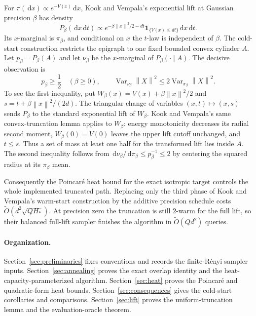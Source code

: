 \documentclass[11pt]{article}
\theoremstyle{remark}
\newcommand{\1}{\bm 1}
\newcommand{\Var}{\operatorname{Var}}
\newcommand{\dd}{\,\mathrm d}
\newcommand{\norm}[1]{\left\lVert #1\right\rVert}
\begin{document}
For $\pi(\dd x)\propto e^{-V(x)}\dd x$, Kook and Vempala's exponential
lift at Gaussian precision $\beta$ has density
\[
  P_\beta(\dd x\dd t)\propto
  e^{-\beta\norm x^2/2-dt}\1_{\{V(x)\leq dt\}}\dd x\dd t.
\]
Its $x$-marginal is $\pi_\beta$, and conditional on $x$ the $t$-law is
independent of $\beta$.  The cold-start construction restricts the
epigraph to one fixed bounded convex cylinder $A$.  Let
$p_\beta=P_\beta(A)$ and let $\nu_\beta$ be the $x$-marginal of
$P_\beta(\cdot\mid A)$.  The decisive observation is
\begin{equation}\label{eq:intro-uniform-truncation}
  p_\beta\geq\frac12\quad(\beta\geq0),
  \qquad
  \Var_{\nu_\beta}\norm X^2
  \leq2\Var_{\pi_\beta}\norm X^2.
\end{equation}
To see the first inequality, put
$W_\beta(x)=V(x)+\beta\norm x^2/2$ and
$s=t+\beta\norm x^2/(2d)$.  The triangular change of variables
$(x,t)\mapsto(x,s)$ sends $P_\beta$ to the standard exponential lift of
$W_\beta$.  Kook and Vempala's same convex-truncation lemma applies to
$W_\beta$: energy monotonicity decreases its radial second moment,
$W_\beta(0)=V(0)$ leaves the upper lift cutoff unchanged, and $t\leq s$.
Thus a set of mass at least one half for the transformed lift lies
inside $A$.  The second inequality follows from
$\dd\nu_\beta/\dd\pi_\beta\leq p_\beta^{-1}\leq2$ by centering the
squared radius at its $\pi_\beta$ mean.

Consequently the Poincar\'e heat bound for the exact isotropic target
controls the whole implemented truncated path.  Replacing only the
third phase of Kook and Vempala's warm-start construction by the
additive precision schedule costs
$\widetilde O(d^2\sqrt{QH_*})$.  At precision zero the truncation is
still $2$-warm for the full lift, so their balanced full-lift sampler
finishes the algorithm in $\widetilde O(Qd^2)$ queries.

\paragraph{Organization.}
Section~\ref{sec:preliminaries} fixes conventions and records the
finite-R\'enyi sampler inputs.  Section~\ref{sec:annealing} proves the
exact overlap identity and the heat-capacity-parameterized algorithm.
Section~\ref{sec:heat} proves the Poincar\'e and quadratic-form heat
bounds.  Section~\ref{sec:consequences} gives the cold-start corollaries
and comparisons.  Section~\ref{sec:lift} proves the uniform-truncation
lemma and the evaluation-oracle theorem.
\end{document}
